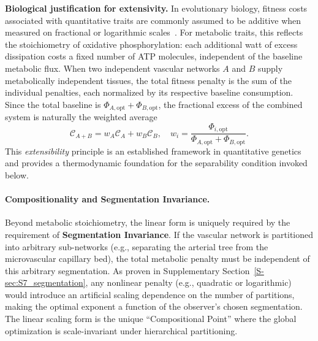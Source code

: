 \textbf{Biological justification for extensivity.} In evolutionary biology,
fitness costs associated with quantitative traits are commonly assumed to be
additive when measured on fractional or logarithmic scales~\cite{lande1983}. For
metabolic traits, this reflects the stoichiometry of oxidative phosphorylation:
each additional watt of excess dissipation costs a fixed number of ATP
molecules, independent of the baseline metabolic flux. When two independent
vascular networks $A$ and $B$ supply metabolically independent tissues, the
total fitness penalty is the sum of the individual penalties, each normalized by
its respective baseline consumption. Since the total baseline is
$\Phi_{A,\mathrm{opt}} + \Phi_{B,\mathrm{opt}}$, the fractional excess of the
combined system is naturally the weighted average
\begin{equation}
    \mathcal{C}_{A+B} = w_A \mathcal{C}_A + w_B \mathcal{C}_B, \quad
    w_i = \frac{\Phi_{i,\mathrm{opt}}}{\Phi_{A,\mathrm{opt}} + \Phi_{B,\mathrm{opt}}}.
\end{equation}
This \emph{extensibility} principle is an established framework in quantitative
genetics and provides a thermodynamic foundation for the separability condition
invoked below.

\paragraph{Compositionality and Segmentation Invariance.} 
Beyond metabolic stoichiometry, the linear form is uniquely required by the
requirement of \textbf{Segmentation Invariance}. If the vascular network is
partitioned into arbitrary sub-networks (e.g., separating the arterial tree from
the microvascular capillary bed), the total metabolic penalty must be
independent of this arbitrary segmentation. As proven in Supplementary
Section~\ref{S-sec:S7_segmentation}, any nonlinear penalty (e.g., quadratic or
logarithmic) would introduce an artificial scaling dependence on the number of
partitions, making the optimal exponent a function of the observer's chosen
segmentation. The linear scaling form is the unique ``Compositional Point''
where the global optimization is scale-invariant under hierarchical
partitioning.

